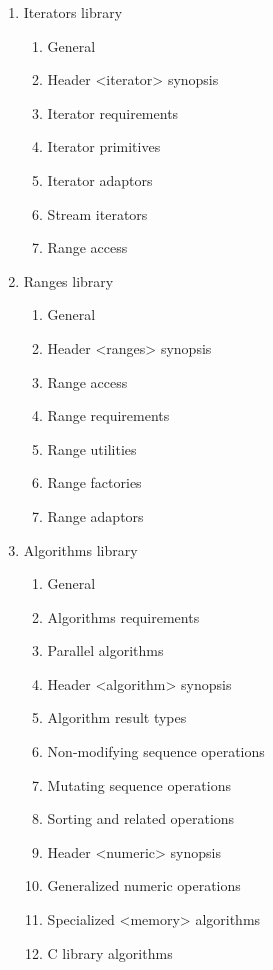 \begin{enumerate}
\begin{enumerate}[label=\arabic{enumi}.\arabic*.]
     \end{enumerate}
\item Iterators library
    \begin{enumerate}[label=\arabic{enumi}.\arabic*.]
      \item General 
      \item Header <iterator> synopsis
      \item Iterator requirements 
      \item Iterator primitives 
      \item  Iterator adaptors 
      \item Stream iterators 
      \item  Range access
     \end{enumerate}
\item Ranges library
    \begin{enumerate}[label=\arabic{enumi}.\arabic*.]
      \item General       
      \item Header <ranges> synopsis
      \item Range access 
      \item Range requirements 
      \item Range utilities 
      \item Range factories 
      \item Range adaptors
     \end{enumerate}
\item Algorithms library
    \begin{enumerate}[label=\arabic{enumi}.\arabic*.]
      \item  General 
      \item  Algorithms requirements 
      \item Parallel algorithms 
      \item Header <algorithm> synopsis 
      \item Algorithm result types 
      \item Non-modifying sequence operations
      \item  Mutating sequence operations 
      \item Sorting and related operations 
      \item Header <numeric> synopsis 
      \item Generalized numeric operations 
      \item Specialized <memory> algorithms 
      \item C library algorithms
     \end{enumerate}

\end{enumerate}
